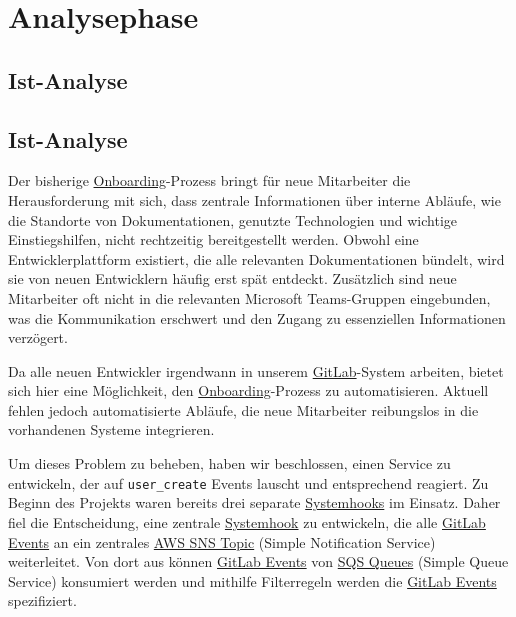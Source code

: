 
\section{Analysephase}
\label{sec:Analysephase}

\subsection{Ist-Analyse}
\label{sec:IstAnalyse}

\subsection{Ist-Analyse}
\label{sec:IstAnalyse}

Der bisherige \hyperlink{Onboarding}{\textcolor{AOBlau}{Onboarding}}-Prozess bringt für neue Mitarbeiter die Herausforderung mit sich, dass zentrale Informationen über interne Abläufe, wie die Standorte von Dokumentationen, genutzte Technologien und wichtige Einstiegshilfen, nicht rechtzeitig bereitgestellt werden. Obwohl eine Entwicklerplattform existiert, die alle relevanten Dokumentationen bündelt, wird sie von neuen Entwicklern häufig erst spät entdeckt. Zusätzlich sind neue Mitarbeiter oft nicht in die relevanten Microsoft Teams-Gruppen eingebunden, was die Kommunikation erschwert und den Zugang zu essenziellen Informationen verzögert.

Da alle neuen Entwickler irgendwann in unserem \hyperlink{GitLab}{\textcolor{AOBlau}{GitLab}}-System arbeiten, bietet sich hier eine Möglichkeit, den \hyperlink{Onboarding}{\textcolor{AOBlau}{Onboarding}}-Prozess zu automatisieren. Aktuell fehlen jedoch automatisierte Abläufe, die neue Mitarbeiter reibungslos in die vorhandenen Systeme integrieren.

Um dieses Problem zu beheben, haben wir beschlossen, einen Service zu entwickeln, der auf \texttt{user\_create} Events lauscht und entsprechend reagiert. Zu Beginn des Projekts waren bereits drei separate \hyperlink{GitLabSystemhooks}{\textcolor{AOBlau}{Systemhooks}} im Einsatz. Daher fiel die Entscheidung, eine zentrale \hyperlink{GitLabSystemhooks}{\textcolor{AOBlau}{Systemhook}} zu entwickeln, die alle \hyperlink{GitLabEvent}{\textcolor{AOBlau}{GitLab Events}} an ein zentrales \hyperlink{SNS}{\textcolor{AOBlau}{AWS SNS Topic}} (Simple Notification Service) weiterleitet. Von dort aus können \hyperlink{GitLabEvent}{\textcolor{AOBlau}{GitLab Events}} von \hyperlink{SQS}{\textcolor{AOBlau}{SQS Queues}} (Simple Queue Service) konsumiert werden und mithilfe Filterregeln werden die \hyperlink{GitLabEvent}{\textcolor{AOBlau}{GitLab Events}} spezifiziert.



